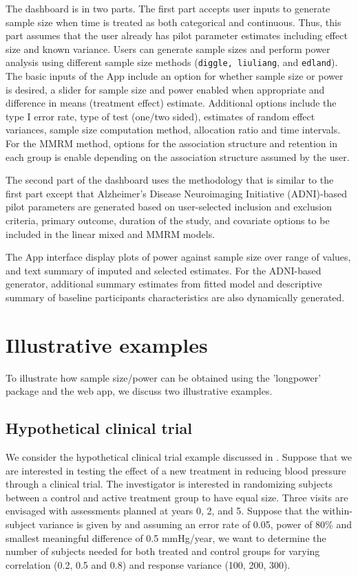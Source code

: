\documentclass[oupdraft]{bio}
\begin{document}
The dashboard is in two parts. The first part accepts user inputs to generate sample size when time is treated as both categorical and continuous. Thus, this part assumes that the user already has pilot parameter estimates including effect size and known variance. Users can generate sample sizes and perform power analysis using different sample size methods (\texttt{diggle, liuliang}, and \texttt{edland}). The basic inputs of the App include an option for whether sample size or power is desired, a slider for sample size and power enabled when appropriate and difference in means (treatment effect) estimate. Additional options include the type I error rate, type of test (one/two sided), estimates of random effect variances, sample size computation method, allocation ratio and time intervals. For the MMRM method, options for the association structure and retention in each group is enable depending on the association structure assumed by the user. 

The second part of the dashboard uses the methodology that is similar to the first part except that Alzheimer's Disease Neuroimaging Initiative (ADNI)-based pilot parameters are generated based on user-selected inclusion and exclusion criteria, primary outcome, duration of the study, and covariate options to be included in the linear mixed and MMRM models. 

The App interface display plots of power against sample size over range of values, and text summary of imputed and selected estimates. For the ADNI-based generator, additional summary estimates from fitted model and descriptive summary of baseline participants characteristics are also dynamically generated.


\section{Illustrative examples}
\label{sec3}
To illustrate how sample size/power can be obtained using the 'longpower' package and the web app, we discuss two illustrative examples. 
\subsection{Hypothetical clinical trial}
We consider the hypothetical clinical trial example discussed in \cite{Diggle_etal(2002)}. Suppose that we are interested in testing the effect of a new treatment in reducing blood pressure through a clinical trial. The investigator is interested in randomizing subjects between a control and active treatment group to have equal size. Three visits are envisaged 
with assessments planned at years 0, 2, and 5. Suppose that the within-subject variance is given by and assuming an error rate of 0.05, power of 80\% and smallest meaningful difference of 0.5 mmHg/year, we want to determine the number of subjects needed
for both treated and control groups for varying correlation (0.2, 0.5 and 0.8) and response variance (100, 200, 300).
\end{document}

